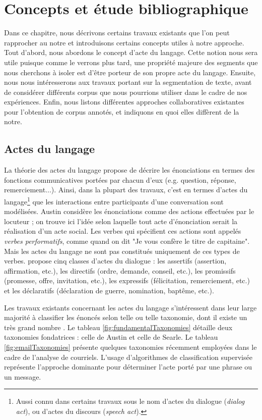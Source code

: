 
\chapter{Concepts et étude bibliographique}

\label{ch:background_and_related_work}

Dans ce chapitre, nous décrivons certains travaux existants que l'on peut rapprocher au notre et introduisons certains concepts utiles à notre approche. Tout d'abord, nous abordons le concept d'acte du langage. Cette notion nous sera utile puisque comme le verrons plus tard, une propriété majeure des segments que nous cherchons à isoler est d'être porteur de son propre acte du langage. Ensuite, nous nous intéresserons aux travaux portant sur la segmentation de texte, avant de considérer différents corpus que nous pourrions utiliser dans le cadre de nos expériences. Enfin, nous listons différentes approches collaboratives existantes pour l'obtention de corpus annotés, et indiquons en quoi elles diffèrent de la notre.

\section{Actes du langage}

La théorie des actes du langage \cite{austin1975things} propose de décrire les énonciations en termes des fonctions communicatives portées par chacun d'eux (e.g. question, réponse, remerciement...). Ainsi, dans la plupart des travaux, c'est en termes d'actes du langage\footnote{Aussi connu dans certains travaux sous le nom d'actes du dialogue (\textit{dialog act}), ou d'actes du discours (\textit{speech act}).} que les interactions entre participants d'une conversation sont modélisées. Austin considère les énonciations comme des actions effectuées par le locuteur ; on trouve ici l'idée selon laquelle tout acte d'énonciation serait la réalisation d'un acte social. Les verbes qui spécifient ces actions sont appelés \textit{verbes performatifs}, comme quand on dit "Je vous confère le titre de capitaine". Mais les actes du langage ne sont pas constitués uniquement de ces types de verbes. \cite{searle1976taxonomy} propose cinq classes d'actes du dialogue : les assertifs (assertion, affirmation, etc.), les directifs (ordre, demande, conseil, etc.), les promissifs (promesse, offre, invitation, etc.), les expressifs (félicitation, remerciement, etc.) et les déclaratifs (déclaration de guerre, nomination, baptême, etc.).

Les travaux existants concernant les actes du langage s'intéressent dans leur large majorité à classifier les énoncés selon telle ou telle taxonomie, dont il existe un très grand nombre \cite{traum200020}. Le tableau \ref{fig:fundamentalTaxonomies} détaille deux taxonomies fondatrices : celle de Austin et celle de Searle. Le tableau \ref{fig:emailTaxonomies} présente quelques taxonomies récemment employées dans le cadre de l'analyse de courriels. L'usage d'algorithmes de classification supervisée \cite{joty:2013:sigdial} représente l'approche dominante pour déterminer l'acte porté par une phrase ou un message.

